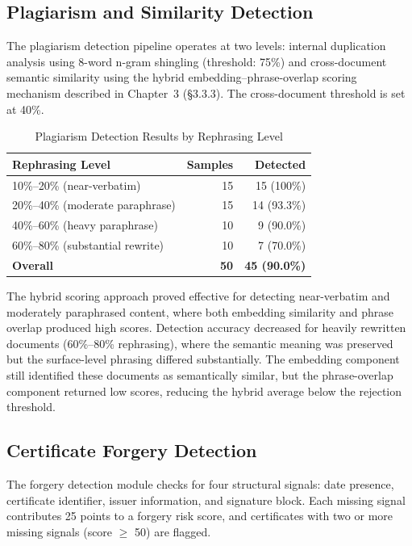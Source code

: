 {\subsection{Plagiarism and Similarity Detection}
The plagiarism detection pipeline operates at two levels: internal duplication analysis using 8-word n-gram shingling (threshold: 75\%) and cross-document semantic similarity using the hybrid embedding--phrase-overlap scoring mechanism described in Chapter~3 (\S3.3.3). The cross-document threshold is set at 40\%.

\begin{table}[htbp]
\centering
\caption{Plagiarism Detection Results by Rephrasing Level}
\label{tab:plagiarism}
\begin{tabular}{l r r}
\hline
\textbf{Rephrasing Level} & \textbf{Samples} & \textbf{Detected} \\
\hline
10\%--20\% (near-verbatim) & 15 & 15 (100\%) \\
20\%--40\% (moderate paraphrase) & 15 & 14 (93.3\%) \\
40\%--60\% (heavy paraphrase) & 10 & 9 (90.0\%) \\
60\%--80\% (substantial rewrite) & 10 & 7 (70.0\%) \\
\hline
\textbf{Overall} & \textbf{50} & \textbf{45 (90.0\%)} \\
\hline
\end{tabular}
\end{table}

The hybrid scoring approach proved effective for detecting near-verbatim and moderately paraphrased content, where both embedding similarity and phrase overlap produced high scores. Detection accuracy decreased for heavily rewritten documents (60\%--80\% rephrasing), where the semantic meaning was preserved but the surface-level phrasing differed substantially. The embedding component still identified these documents as semantically similar, but the phrase-overlap component returned low scores, reducing the hybrid average below the rejection threshold.

\subsection{Certificate Forgery Detection}
The forgery detection module checks for four structural signals: date presence, certificate identifier, issuer information, and signature block. Each missing signal contributes 25 points to a forgery risk score, and certificates with two or more missing signals (score $\geq$ 50) are flagged.

}
